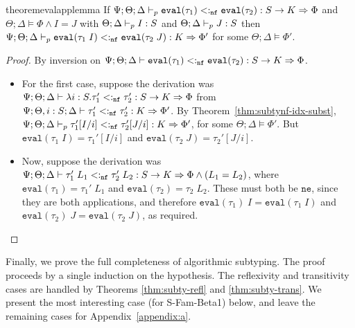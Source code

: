 \begin{restatable}{theorem}{evalapplemma}
If $\Psi ; \Theta ; \Delta \vdash_p \texttt{eval}(\tau_1) <:_{\texttt{nf}} \texttt{eval}(\tau_2) : S \to K \Rightarrow \Phi$ and $\Theta ; \Delta \vDash \Phi \wedge I = J$ with $\Theta ; \Delta \vdash_p I : S$ and $\Theta ; \Delta \vdash_p J : S$ then 
$\Psi ; \Theta ; \Delta \vdash_p \texttt{eval}(\tau_1 \; I) <:_{\texttt{nf}} \texttt{eval}(\tau_2 \; J) : K \Rightarrow \Phi'$ for some $\Theta ; \Delta \vDash \Phi'$.
\label{thm:eval-app-lemma}
\end{restatable}
\begin{proof}
By inversion on $\Psi ; \Theta ; \Delta \vdash \texttt{eval}(\tau_1) <:_{\texttt{nf}} \texttt{eval}(\tau_2) : S \to K \Rightarrow \Phi$.
\begin{itemize}
  \item For the first case, suppose the derivation was $\Psi ; \Theta ; \Delta \vdash \lambda i : S. \tau_1' <:_{\texttt{nf}} \tau_2' : S \to K \Rightarrow \Phi$
  from $\Psi ; \Theta, i : S ; \Delta \vdash \tau_1' <:_{\texttt{nf}} \tau_2' : K \Rightarrow \Phi'$. By Theorem~\ref{thm:subtynf-idx-subst},
  $\Psi ; \Theta ; \Delta \vdash_p \tau_1'[I/i] <:_{\texttt{nf}} \tau_2'[J/i] : K \Rightarrow \Phi'$, for some $\Theta ; \Delta \vDash \Phi'$. But $\texttt{eval}(\tau_1 \; I) = \tau_1'[I/i]$ and $\texttt{eval}(\tau_2 \; J) = \tau_2'[J/i]$.
  \item Now, suppose the derivation was $\Psi ; \Theta ; \Delta \vdash \tau_1' \; L_1 <:_{\texttt{nf}} \tau_2' \; L_2 : S \to K \Rightarrow \Phi \wedge (L_1 = L_2)$, where $\texttt{eval}(\tau_1) = \tau_1' \; L_1$ and $\texttt{eval}(\tau_2) = \tau_2 \; L_2$. These must both be $\texttt{ne}$, since they are both applications, and therefore
  $\texttt{eval}(\tau_1) \; I = \texttt{eval}(\tau_1 \; I)$ and $\texttt{eval}(\tau_2) \; J = \texttt{eval}(\tau_2 \; J)$, as required.
\end{itemize}
\end{proof}

Finally, we prove the full completeness of algorithmic subtyping. The proof proceeds by a single induction on the hypothesis. The reflexivity and transitivity cases are handled by Theorems \ref{thm:subty-refl} and \ref{thm:subty-trans}. We present the most interesting case (for S-Fam-Beta1) below, and leave the remaining cases for Appendix~\ref{appendix:a}.

